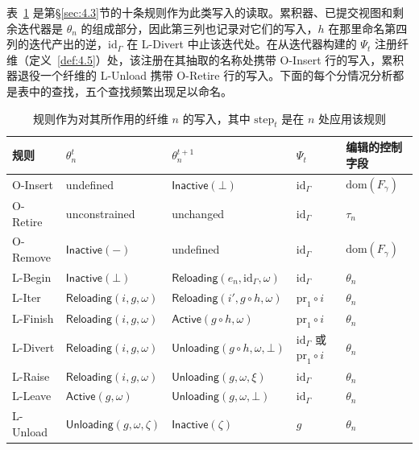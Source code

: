 表~\ref{tab:4.1} 是第\S\ref{sec:4.3}节的十条规则作为此类写入的读取。累积器、已提交视图和剩余迭代器是 $\theta_n$ 的组成部分，因此第三列也记录对它们的写入，$h$ 在那里命名第四列的迭代产出的逆，$\mathrm{id}_\Gamma$ 在 L-Divert 中止该迭代处。在从迭代器构建的 $\Psi_t$ 注册纤维（定义~\ref{def:4.5}）处，该注册在其抽取的名称处携带 O-Insert 行的写入，累积器退役一个纤维的 L-Unload 携带 O-Retire 行的写入。下面的每个分情况分析都是表中的查找，五个查找频繁出现足以命名。

\begin{table}[htbp]
\centering
\caption{规则作为对其所作用的纤维 $n$ 的写入，其中 $\mathrm{step}_t$ 是在 $n$ 处应用该规则}\label{tab:4.1}
\begin{tabular}{lllll}
\hline
规则 & $\theta^t_n$ & $\theta^{t+1}_n$ & $\Psi_t$ & 编辑的控制字段 \\
\hline
O-Insert & undefined & $\mathsf{Inactive}(\bot)$ & $\mathrm{id}_\Gamma$ & $\mathrm{dom}(F_\gamma)$ \\
O-Retire & unconstrained & unchanged & $\mathrm{id}_\Gamma$ & $\tau_n$ \\
O-Remove & $\mathsf{Inactive}(-)$ & undefined & $\mathrm{id}_\Gamma$ & $\mathrm{dom}(F_\gamma)$ \\
L-Begin & $\mathsf{Inactive}(\bot)$ & $\mathsf{Reloading}(e_n, \mathrm{id}_\Gamma, \omega)$ & $\mathrm{id}_\Gamma$ & $\theta_n$ \\
L-Iter & $\mathsf{Reloading}(i, g, \omega)$ & $\mathsf{Reloading}(i', g \circ h, \omega)$ & $\mathrm{pr}_1 \circ i$ & $\theta_n$ \\
L-Finish & $\mathsf{Reloading}(i, g, \omega)$ & $\mathsf{Active}(g \circ h, \omega)$ & $\mathrm{pr}_1 \circ i$ & $\theta_n$ \\
L-Divert & $\mathsf{Reloading}(i, g, \omega)$ & $\mathsf{Unloading}(g \circ h, \omega, \bot)$ & $\mathrm{id}_\Gamma$ 或 $\mathrm{pr}_1 \circ i$ & $\theta_n$ \\
L-Raise & $\mathsf{Reloading}(i, g, \omega)$ & $\mathsf{Unloading}(g, \omega, \xi)$ & $\mathrm{id}_\Gamma$ & $\theta_n$ \\
L-Leave & $\mathsf{Active}(g, \omega)$ & $\mathsf{Unloading}(g, \omega, \bot)$ & $\mathrm{id}_\Gamma$ & $\theta_n$ \\
L-Unload & $\mathsf{Unloading}(g, \omega, \zeta)$ & $\mathsf{Inactive}(\zeta)$ & $g$ & $\theta_n$ \\
\hline
\end{tabular}
\end{table}

